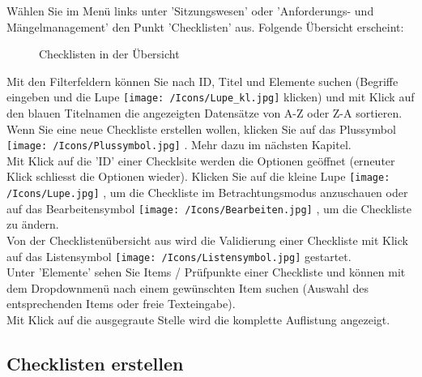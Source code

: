 Wählen Sie im Menü links unter 'Sitzungswesen' oder 'Anforderungs- und Mängelmanagement' den Punkt 'Checklisten' aus. Folgende Übersicht erscheint:

\begin{figure}[H]
\caption{Checklisten in der Übersicht}
\end{figure}

Mit den Filterfeldern können Sie nach ID, Titel und Elemente suchen (Begriffe eingeben und die Lupe \texttt{[image: /Icons/Lupe\_kl.jpg]} klicken) und mit Klick auf den blauen Titelnamen die angezeigten Datensätze von A-Z oder Z-A sortieren.\\
Wenn Sie eine neue Checkliste erstellen wollen, klicken Sie auf das Plussymbol \texttt{[image: /Icons/Plussymbol.jpg]} . Mehr dazu im nächsten Kapitel.\\
Mit Klick auf die 'ID'  einer Checklsite werden die Optionen geöffnet (erneuter Klick schliesst die Optionen wieder). Klicken Sie auf die kleine Lupe \texttt{[image: /Icons/Lupe.jpg]} , um die Checkliste im Betrachtungsmodus anzuschauen oder auf das Bearbeitensymbol \texttt{[image: /Icons/Bearbeiten.jpg]} , um die Checkliste zu ändern.\\
Von der Checklistenübersicht aus wird die Validierung einer Checkliste mit Klick auf das Listensymbol \texttt{[image: /Icons/Listensymbol.jpg]}  gestartet.\\
Unter 'Elemente' sehen Sie Items / Prüfpunkte einer Checkliste und können mit dem Dropdownmenü nach einem gewünschten Item suchen (Auswahl des entsprechenden Items oder freie Texteingabe).\\
Mit Klick auf die ausgegraute Stelle wird die komplette Auflistung angezeigt.

\subsection{Checklisten erstellen}

